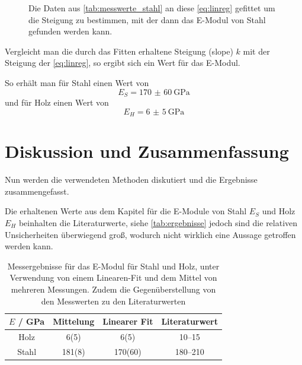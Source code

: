 \documentclass[11pt,ngerman]{scrartcl}
\begin{document}
\begin{figure}[H]
\begin{minipage}[htbp]{\linewidth}
\begin{minipage}[htbp]{.48\linewidth}
        \caption[Linearer-Fit Stahl]{Die Daten aus \autoref{tab:messwerte_stahl}
            an diese \autoref{eq:linreg} gefittet um die Steigung zu bestimmen,
            mit der dann das E-Modul von Stahl gefunden werden kann. }
            \label{fig:linregstahl}
        \end{minipage}
    \end{minipage}
\end{figure}


Vergleicht man die durch das Fitten erhaltene Steigung (slope) $k$
mit der Steigung der \autoref{eq:linreg}, so ergibt sich ein Wert für
das E-Modul.

So erhält man für Stahl einen Wert von
\begin{equation}
    E_S = \SI{170(60)}{\GPa}
\end{equation}
und für Holz einen Wert von
\begin{equation}
    E_H = \SI{6(5)}{\GPa}
\end{equation}

\section{Diskussion und Zusammenfassung}
\label{sec:diskussion_zusammenfassung}

Nun werden die verwendeten Methoden diskutiert und die Ergebnisse 
zusammengefasst.

Die erhaltenen Werte aus dem Kapitel  
für die E-Module von Stahl $E_S$ und Holz $E_H$ beinhalten
die Literaturwerte, siehe \autoref{tab:ergebnisse} jedoch sind die relativen Unsicherheiten
überwiegend groß, wodurch nicht wirklich eine Aussage getroffen werden kann.

\begin{table}[H]
    \centering
    \caption{Messergebnisse für das E-Modul für Stahl und Holz, unter Verwendung
    von einem Linearen-Fit und dem Mittel von mehreren Messungen. Zudem
    die Gegenüberstellung von den Messwerten zu den Literaturwerten}
    \label{tab:ergebnisse}
    \begin{tabular}{c|S|S|S}
        $E$ / GPa & {Mittelung} & {Linearer Fit} & {Literaturwert} \\ \hline
        Holz & 6(5) & 6(5) & \numrange{10}{15} \cite{wikielasti2021} \\
        Stahl & 181(8) & 170(60) & \numrange{180}{210} \cite{Ahrberg2011} \\ 
    \end{tabular}
\end{table}
\end{document}

